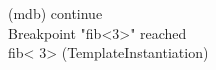 
\begin{tttenv}
(mdb) continue \\
Breakpoint "fib<3>" reached \\
fib<{\color{color04} 3}> (TemplateInstantiation)
\end{tttenv}
